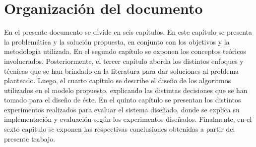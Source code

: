 \section{Organizaci\'on del documento}
\label{intro:organizacion}
En el presente documento se divide en seis cap\'itulos. En \normalsize{este} cap\'itulo se presenta la problem\'atica y la soluci\'on propuesta, en conjunto con los objetivos y la metodolog\'ia utilizada. En el segundo cap\'itulo se exponen los conceptos te\'oricos involucrados. Posteriormente, el tercer cap\'itulo aborda los distintos enfoques y t\'ecnicas que se han brindado en la literatura para dar soluciones al problema planteado. Luego, el cuarto cap\'itulo se describe el dise\~no de los algoritmos utilizados en el modelo propuesto, explicando las distintas decisiones que se han tomado para el dise\~no de \'este. En el quinto cap\'itulo se presentan los distintos experimentos realizados para evaluar el sistema dise\~nado, donde se explica su implementaci\'on y evaluaci\'on seg\'un los experimentos dise\~nados. Finalmente, en el sexto cap\'itulo se exponen las respectivas conclusiones obtenidas a partir del presente trabajo.